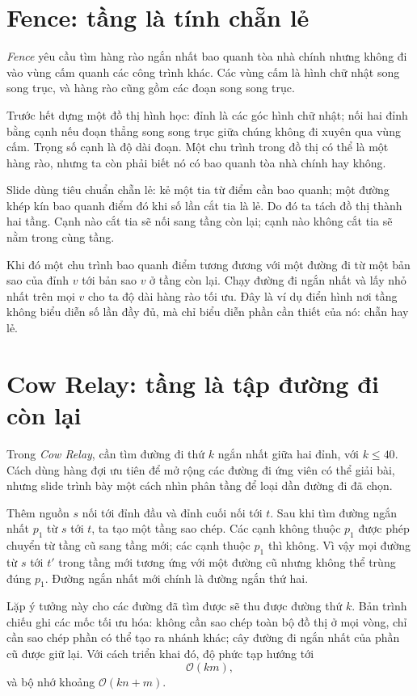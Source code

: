 \documentclass[11pt]{article}
\newcommand{\Oh}{\mathcal{O}}
\begin{document}
\section{Fence: tầng là tính chẵn lẻ}

\textit{Fence} yêu cầu tìm hàng rào ngắn nhất bao quanh tòa nhà chính nhưng
không đi vào vùng cấm quanh các công trình khác. Các vùng cấm là hình chữ nhật
song song trục, và hàng rào cũng gồm các đoạn song song trục.

Trước hết dựng một đồ thị hình học: đỉnh là các góc hình chữ nhật; nối hai
đỉnh bằng cạnh nếu đoạn thẳng song song trục giữa chúng không đi xuyên qua
vùng cấm. Trọng số cạnh là độ dài đoạn. Một chu trình trong đồ thị có thể là
một hàng rào, nhưng ta còn phải biết nó có bao quanh tòa nhà chính hay không.

Slide dùng tiêu chuẩn chẵn lẻ: kẻ một tia từ điểm cần bao quanh; một đường
khép kín bao quanh điểm đó khi số lần cắt tia là lẻ. Do đó ta tách đồ thị
thành hai tầng. Cạnh nào cắt tia sẽ nối sang tầng còn lại; cạnh nào không cắt
tia sẽ nằm trong cùng tầng.

Khi đó một chu trình bao quanh điểm tương đương với một đường đi từ một bản
sao của đỉnh \(v\) tới bản sao \(v\) ở tầng còn lại. Chạy đường đi ngắn nhất
và lấy nhỏ nhất trên mọi \(v\) cho ta độ dài hàng rào tối ưu. Đây là ví dụ
điển hình nơi tầng không biểu diễn số lần đầy đủ, mà chỉ biểu diễn phần cần
thiết của nó: chẵn hay lẻ.

\section{Cow Relay: tầng là tập đường đi còn lại}

Trong \textit{Cow Relay}, cần tìm đường đi thứ \(k\) ngắn nhất giữa hai đỉnh,
với \(k\le 40\). Cách dùng hàng đợi ưu tiên để mở rộng các đường đi ứng viên
có thể giải bài, nhưng slide trình bày một cách nhìn phân tầng để loại dần
đường đi đã chọn.

Thêm nguồn \(s\) nối tới đỉnh đầu và đỉnh cuối nối tới \(t\). Sau khi tìm
đường ngắn nhất \(p_1\) từ \(s\) tới \(t\), ta tạo một tầng sao chép. Các cạnh
không thuộc \(p_1\) được phép chuyển từ tầng cũ sang tầng mới; các cạnh thuộc
\(p_1\) thì không. Vì vậy mọi đường từ \(s\) tới \(t'\) trong tầng mới tương
ứng với một đường cũ nhưng không thể trùng đúng \(p_1\). Đường ngắn nhất mới
chính là đường ngắn thứ hai.

Lặp ý tưởng này cho các đường đã tìm được sẽ thu được đường thứ \(k\). Bản
trình chiếu ghi các mốc tối ưu hóa: không cần sao chép toàn bộ đồ thị ở mọi
vòng, chỉ cần sao chép phần có thể tạo ra nhánh khác; cây đường đi ngắn nhất
của phần cũ được giữ lại. Với cách triển khai đó, độ phức tạp hướng tới
\[
  \Oh(km),
\]
và bộ nhớ khoảng \(\Oh(kn+m)\).
\end{document}
